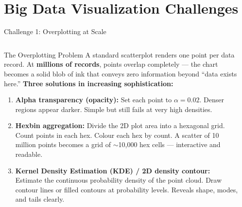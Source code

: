 \documentclass[aspectratio=169,10pt]{beamer}
\begin{document}
\section{Big Data Visualization Challenges}

\begin{frame}{Challenge 1: Overplotting at Scale}
  \begin{columns}[T]
      \begin{block}{The Overplotting Problem}
        A standard scatterplot renders one point per data record.  At \textbf{millions of records}, points overlap completely --- the chart becomes a solid blob of ink that conveys zero information beyond ``data exists here.''
        \vspace{4pt}
        \textbf{Three solutions in increasing sophistication:}
        \begin{enumerate}
          \item \textbf{Alpha transparency (opacity):}  Set each point to $\alpha = 0.02$.  Denser regions appear darker.  Simple but still fails at very high densities.
          \item \textbf{Hexbin aggregation:}  Divide the 2D plot area into a hexagonal grid.  Count points in each hex.  Colour each hex by count.  A scatter of 10 million points becomes a grid of $\sim$10{,}000 hex cells --- interactive and readable.
          \item \textbf{Kernel Density Estimation (KDE) / 2D density contour:}  Estimate the continuous probability density of the point cloud.  Draw contour lines or filled contours at probability levels.  Reveals shape, modes, and tails clearly.
        \end{enumerate}
      \end{block}

      \begin{center}
\end{center}
\end{columns}
\end{frame}
\end{document}
